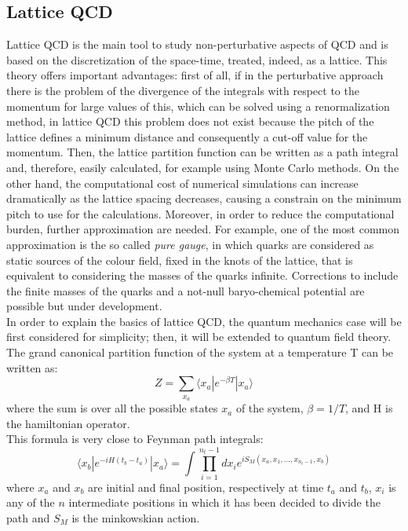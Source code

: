 \subsection{Lattice QCD}
%
Lattice QCD is the main tool to study non-perturbative aspects of QCD and is based on the discretization of the space-time, treated, indeed, as a lattice. This theory offers important advantages: first of all, if in the perturbative approach there is the problem of the divergence of the integrals with respect to the momentum for large values of this, which can be solved using a renormalization method, in lattice QCD this problem does not exist because the pitch of the lattice defines a minimum distance and consequently a cut-off value for the momentum. Then, the lattice partition function can be written as a path integral and, therefore, easily calculated, for example using Monte Carlo methods. On the other hand, the computational cost of numerical simulations can increase dramatically as the lattice spacing decreases, causing a constrain on the minimum pitch to use for the calculations. Moreover, in order to reduce the computational burden, further approximation are needed. For example, one of the most common approximation is the so called \textit{pure gauge}, in which quarks are considered as static sources of the colour field, fixed in the knots of the lattice, that is equivalent to considering the masses of the quarks infinite. Corrections to include the finite masses of the quarks and a not-null baryo-chemical potential are possible but under development.\\
In order to explain the basics of lattice QCD, the quantum mechanics case will be first considered for simplicity; then, it will be extended to quantum field theory.
The grand canonical partition function of the system at a temperature T can be written as:
%
\begin{equation}
 Z = \sum\limits_{x_{a}}\langle x_{a} | e^{-\beta T} | x_{a} \rangle
\end{equation}
%
where the sum is over all the possible states $x_{a}$ of the system, $\beta=1/T$, and H is the hamiltonian operator.\\
This formula is very close to Feynman path integrals:
%
\begin{equation}
 \langle x_{b} | e^{- i H (t_{b} - t_{a})} | x_{a} \rangle = \int \prod\limits_{i=1}^{n_{t}-1} dx_{i} e^{i S_{M}(x_{a},x_{1},\dots,x_{n_{t}-1},x_{b})}
\end{equation}
where $x_{a}$ and $x_{b}$ are initial and final position, respectively at time $t_{a}$ and  $t_{b}$, $x_{i}$ is any of the $n$ intermediate positions in which it has been decided to divide the path and $S_{M}$ is the minkowskian action.\\
